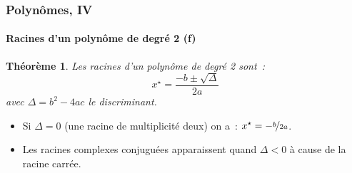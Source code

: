\documentclass[10pt,notheorems]{beamer}
\theoremstyle{plain}
\newtheorem{theorem}{Théorème}
\theoremstyle{definition} %
\begin{document}
\begin{frame}
  \frametitle{Polynômes, IV}
  \framesubtitle{Racines d'un polynôme de degré 2 (f)}
  \hypertarget{slide_polynome_2_racines_5}{}

  \bigskip

  \begin{theorem}\label{thm:poly_2_roots}
    Les racines d'un polynôme de degré 2 sont~:
    \[
      x^{\star} = \frac{-b \pm \sqrt{\Delta}}{2a}
    \]
    avec $\Delta = b^2-4ac$ le discriminant.
  \end{theorem}

  \bigskip

  \begin{itemize}

  \item Si $\Delta=0$ (une racine de multiplicité deux) on a~: $x^{\star} = -\nicefrac{b}{2a}$.\newline

  \item Les racines complexes conjuguées apparaissent quand $\Delta<0$ à cause de la racine carrée.\newline

  \end{itemize}

\end{frame}
\end{document}
